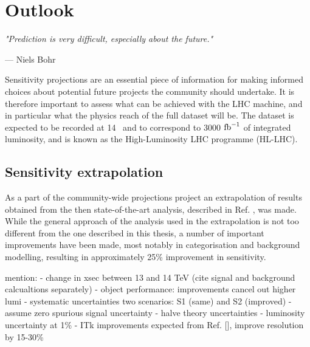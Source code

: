 \chapter{Outlook}

\textit{"Prediction is very difficult, especially about the future."}

\vspace{5mm}
\begin{flushright}
--- Niels Bohr
\end{flushright}

\thispagestyle{empty}

\newpage

Sensitivity projections are an essential piece of information for
making informed choices about potential future projects the community
should undertake.
It is therefore important to assess what can be achieved with the LHC
machine, and in particular what the physics reach of the full dataset
will be. The dataset is expected to be recorded at 14 \TeV~and to
correspond to 3000 $\text{fb}^{-1}$ of integrated luminosity, and is known
as the High-Luminosity LHC programme (HL-LHC).

\section{Sensitivity extrapolation}

As a part of the community-wide projections project \cite{ATL-PHYS-PUB-2018-054, Cepeda:2019klc}
an extrapolation of results obtained from the then state-of-the-art
analysis, described in Ref. \cite{ATLAS-CONF-2018-026}, was made.
While the general approach of the analysis used in the extrapolation
is not too different from the one described in this thesis, a number
of important improvements have been made, most notably in categorisation
and background modelling, resulting in approximately 25\% improvement
in sensitivity.





mention:
- change in xsec between 13 and 14 TeV (cite signal and background calcualtions separately)
- object performance: improvements cancel out higher lumi
- systematic uncertainties two scenarios: S1 (same) and S2 (improved)
    - assume zero spurious signal uncertainty
    - halve theory uncertainties
    - luminosity uncertainty at 1\%
- ITk improvements expected from Ref. [], improve resolution by 15-30\%


